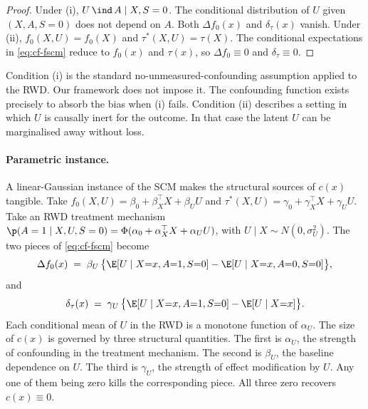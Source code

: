 \begin{proof}
Under (i), $U \,\ind\, A \mid X, S = 0$. The conditional distribution of $U$ given $(X, A, S = 0)$ does not depend on $A$. Both $\Delta f_0(x)$ and $\delta_\tau(x)$ vanish.
Under (ii), $f_0(X, U) = f_0(X)$ and $\tau^*(X, U) = \tau(X)$. The conditional expectations in \eqref{eq:cf-fscm} reduce to $f_0(x)$ and $\tau(x)$, so $\Delta f_0 \equiv 0$ and $\delta_\tau \equiv 0$.
\end{proof}

Condition (i) is the standard no-unmeasured-confounding assumption applied to the RWD.
Our framework does not impose it.
The confounding function exists precisely to absorb the bias when (i) fails.
Condition (ii) describes a setting in which $U$ is causally inert for the outcome.
In that case the latent $U$ can be marginalised away without loss.

\paragraph{Parametric instance.}
A linear-Gaussian instance of the SCM makes the structural sources of $c(x)$ tangible.
Take $f_0(X, U) = \beta_0 + \beta_X^\top X + \beta_U U$ and $\tau^*(X, U) = \gamma_0 + \gamma_X^\top X + \gamma_U U$.
Take an RWD treatment mechanism $\p(A = 1 \mid X, U, S = 0) = \Phi(\alpha_0 + \alpha_X^\top X + \alpha_U U)$, with $U \mid X \sim N(0, \sigma_U^2)$.
The two pieces of \eqref{eq:cf-fscm} become
\begin{equation}
\Delta f_0(x) \;=\; \beta_U\,\bigl\{\E[U \mid X{=}x, A{=}1, S{=}0] - \E[U \mid X{=}x, A{=}0, S{=}0]\bigr\},
\end{equation}
and
\begin{equation}
\delta_\tau(x) \;=\; \gamma_U\,\bigl\{\E[U \mid X{=}x, A{=}1, S{=}0] - \E[U \mid X{=}x]\bigr\}.
\end{equation}
Each conditional mean of $U$ in the RWD is a monotone function of $\alpha_U$.
The size of $c(x)$ is governed by three structural quantities.
The first is $\alpha_U$, the strength of confounding in the treatment mechanism.
The second is $\beta_U$, the baseline dependence on $U$.
The third is $\gamma_U$, the strength of effect modification by $U$.
Any one of them being zero kills the corresponding piece.
All three zero recovers $c(x) \equiv 0$.

